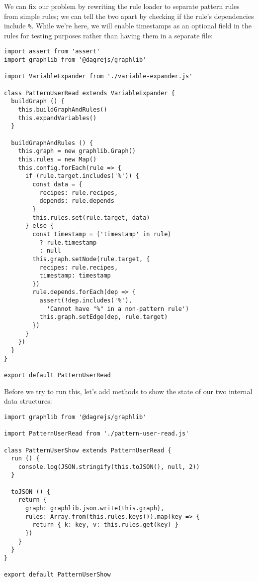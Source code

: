 \documentclass[krantzl]{krantz}
\begin{document}
We can fix our problem by rewriting the rule loader
to separate pattern rules from simple rules;
we can tell the two apart by checking if the rule’s dependencies include \texttt{\%}.
While we’re here,
we will enable timestamps as an optional field in the rules for testing purposes
rather than having them in a separate file:


\begin{lstlisting}[frame=tblr]
import assert from 'assert'
import graphlib from '@dagrejs/graphlib'

import VariableExpander from './variable-expander.js'

class PatternUserRead extends VariableExpander {
  buildGraph () {
    this.buildGraphAndRules()
    this.expandVariables()
  }

  buildGraphAndRules () {
    this.graph = new graphlib.Graph()
    this.rules = new Map()
    this.config.forEach(rule => {
      if (rule.target.includes('%')) {
        const data = {
          recipes: rule.recipes,
          depends: rule.depends
        }
        this.rules.set(rule.target, data)
      } else {
        const timestamp = ('timestamp' in rule)
          ? rule.timestamp
          : null
        this.graph.setNode(rule.target, {
          recipes: rule.recipes,
          timestamp: timestamp
        })
        rule.depends.forEach(dep => {
          assert(!dep.includes('%'),
            'Cannot have "%" in a non-pattern rule')
          this.graph.setEdge(dep, rule.target)
        })
      }
    })
  }
}

export default PatternUserRead
\end{lstlisting}



Before we try to run this,
let’s add methods to show the state of our two internal data structures:


\begin{lstlisting}[frame=tblr]
import graphlib from '@dagrejs/graphlib'

import PatternUserRead from './pattern-user-read.js'

class PatternUserShow extends PatternUserRead {
  run () {
    console.log(JSON.stringify(this.toJSON(), null, 2))
  }

  toJSON () {
    return {
      graph: graphlib.json.write(this.graph),
      rules: Array.from(this.rules.keys()).map(key => {
        return { k: key, v: this.rules.get(key) }
      })
    }
  }
}

export default PatternUserShow
\end{lstlisting}
\end{document}
